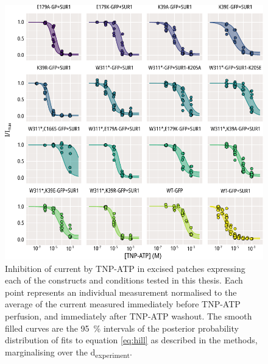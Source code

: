 \begin{figure}[h]
	\centering
	\includegraphics[width=\textwidth]{all_tnpatp_fits.pdf}
	\caption[TNP-ATP inhibition population hill fits]{
	Inhibition of current by TNP-ATP in excised patches expressing each of the constructs and conditions tested in this thesis.
	Each point represents an individual measurement normalised to the average of the current measured immediately before TNP-ATP perfusion, and immediately after TNP-ATP washout.
	The smooth filled curves are the \SI{95}{\percent} intervals of the posterior probability distribution of fits to equation \ref{eq:hill} as described in the methods, marginalising over the \textgreek{d}\textsubscript{experiment}.
	}
	\label{apxfig:tnpatp_inhib_1}
\end{figure}

